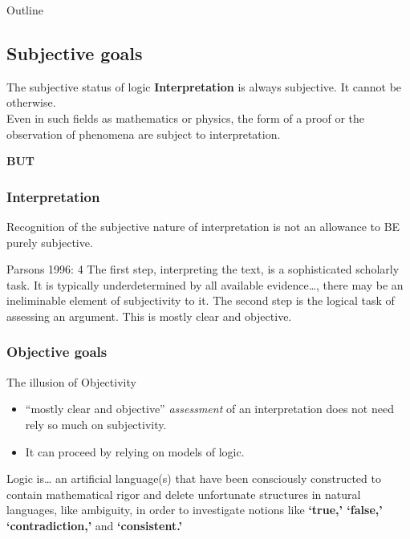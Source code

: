 \documentclass{beamer}
\begin{document}
\begin{frame}{Outline}
\subsection{Subjective goals}
\begin{frame}{The subjective status of logic}
\textbf{Interpretation} is always subjective. It cannot be otherwise. 
\\
Even in such fields as mathematics or physics, the form of a proof or the observation of phenomena are subject to interpretation.\\
\pause

{\bf BUT}

\end{frame}

\begin{frame}\frametitle{Interpretation}
Recognition of the subjective nature of interpretation is not an allowance to BE purely subjective. \pause
\begin{block}{Parsons 1996: 4}
The first step, interpreting the text, is a sophisticated scholarly task.  It is typically underdetermined by all available evidence\dots, there may be an ineliminable element of subjectivity to it.  The second step is the logical task of assessing an argument.  This is mostly clear and objective.  
\end{block}  
\end{frame}

\subsubsection{Objective goals}
\begin{frame}{The illusion of Objectivity}
\begin{itemize}
\item  ``mostly clear and objective'' \textsl{assessment} of an interpretation does not need rely so much on subjectivity. 
\item It can proceed by relying on models of logic.
\end{itemize}
\pause
\begin{block}{Logic is\ldots} 
an artificial language(s) that have been consciously constructed to contain mathematical rigor and delete unfortunate structures in natural languages, like ambiguity, in order to investigate notions like {\bf `true,' `false,' `contradiction,'} and {\bf `consistent.'}
\end{block}
\end{frame}


\end{frame}
\end{document}
